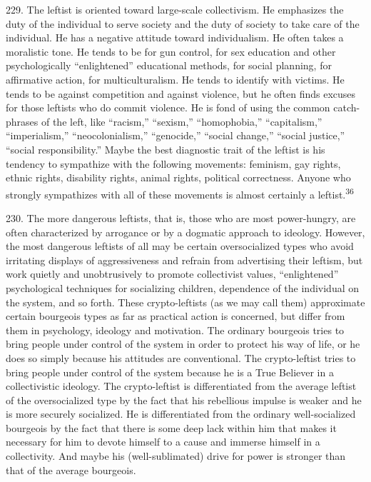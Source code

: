 \documentclass{article}
\begin{document}
229. The leftist is oriented toward large-scale collectivism. He emphasizes the duty of the 
individual to serve society and the duty of society to take care of the individual. He has a negative 
attitude toward individualism. He often takes a moralistic tone. He tends to be for gun control, 
for sex education and other psychologically “enlightened” educational methods, for social 
planning, for affirmative action, for multiculturalism. He tends to identify with victims. He tends 
to be against competition and against violence, but he often finds excuses for those leftists who do 
commit violence. He is fond of using the common catch-phrases of the left, like “racism,” 
“sexism,” “homophobia,” “capitalism,” “imperialism,” “neocolonialism,” “genocide,” “social 
change,” “social justice,” “social responsibility.” Maybe the best diagnostic trait of the leftist is 
his tendency to sympathize with the following movements: feminism, gay rights, ethnic rights, 
disability rights, animal rights, political correctness. Anyone who strongly sympathizes with all 
of these movements is almost certainly a leftist.\textsuperscript{36} \vspace{\baselineskip}

230. The more dangerous leftists, that is, those who are most power-hungry, are often 
characterized by arrogance or by a dogmatic approach to ideology. However, the most dangerous 
leftists of all may be certain oversocialized types who avoid irritating displays of aggressiveness 
and refrain from advertising their leftism, but work quietly and unobtrusively to promote 
collectivist values, “enlightened” psychological techniques for socializing children, dependence 
of the individual on the system, and so forth. These crypto-leftists (as we may call them) 
approximate certain bourgeois types as far as practical action is concerned, but differ from them 
in psychology, ideology and motivation. The ordinary bourgeois tries to bring people under 
control of the system in order to protect his way of life, or he does so simply because his attitudes 
are conventional. The crypto-leftist tries to bring people under control of the system because he 
is a True Believer in a collectivistic ideology. The crypto-leftist is differentiated from the average 
leftist of the oversocialized type by the fact that his rebellious impulse is weaker and he is more 
securely socialized. He is differentiated from the ordinary well-socialized bourgeois by the fact 
that there is some deep lack within him that makes it necessary for him to devote himself to a cause 
and immerse himself in a collectivity. And maybe his (well-sublimated) drive for power is 
stronger than that of the average bourgeois. 
\end{document}

